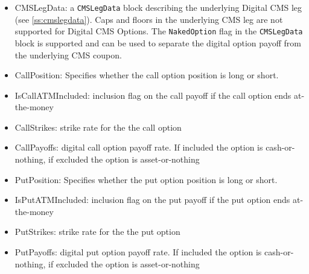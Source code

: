 \begin{itemize}
\item CMSLegData: a \lstinline!CMSLegData! block describing the underlying Digital CMS leg (see \ref{ss:cmslegdata}).
Caps and floors in the underlying CMS leg are not supported for Digital CMS Options. The \lstinline!NakedOption! flag in the
\lstinline!CMSLegData! block is supported and can be used to separate the digital option payoff from the underlying CMS coupon.
\item CallPosition: Specifies whether the call option position is long or short.
\item IsCallATMIncluded: inclusion flag on the call payoff if the call option ends at-the-money
\item CallStrikes: strike rate for the the call option
\item CallPayoffs: digital call option payoff rate. If included the option is cash-or-nothing, if excluded the option is asset-or-nothing
\item PutPosition: Specifies whether the put option position is long  or short.
\item IsPutATMIncluded: inclusion flag on the put payoff if the put option ends at-the-money
\item PutStrikes: strike rate for the the put option
\item PutPayoffs: digital put option payoff rate. If included the option is cash-or-nothing, if excluded the option is asset-or-nothing
\end{itemize}
